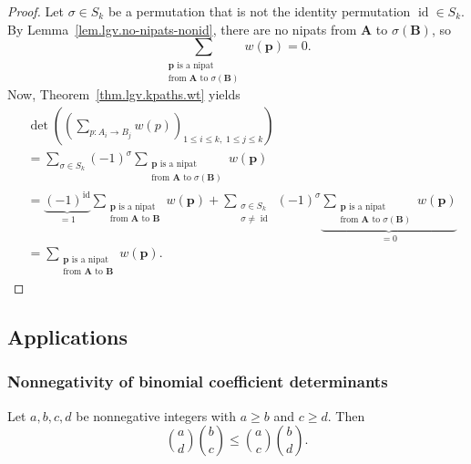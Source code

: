 \begin{proof}
Let $\sigma \in S_k$ be a permutation that is not the identity
permutation $\operatorname{id} \in S_k$.
By Lemma~\ref{lem.lgv.no-nipats-nonid}, there are no nipats from
$\mathbf{A}$ to $\sigma(\mathbf{B})$, so
\[
  \sum_{\substack{\mathbf{p} \text{ is a nipat} \\ \text{from } \mathbf{A} \text{ to } \sigma(\mathbf{B})}}
    w(\mathbf{p}) = 0.
\]
Now, Theorem~\ref{thm.lgv.kpaths.wt} yields
\begin{align*}
  &\det\!\left(\left(\sum_{p : A_i \to B_j} w(p)\right)_{1 \le i \le k,\; 1 \le j \le k}\right) \\
  &= \sum_{\sigma \in S_k} (-1)^{\sigma}
    \sum_{\substack{\mathbf{p} \text{ is a nipat} \\ \text{from } \mathbf{A} \text{ to } \sigma(\mathbf{B})}}
    w(\mathbf{p}) \\
  &= \underbrace{(-1)^{\operatorname{id}}}_{=1}
    \sum_{\substack{\mathbf{p} \text{ is a nipat} \\ \text{from } \mathbf{A} \text{ to } \mathbf{B}}}
    w(\mathbf{p})
    + \sum_{\substack{\sigma \in S_k \\ \sigma \ne \operatorname{id}}} (-1)^{\sigma}
      \underbrace{\sum_{\substack{\mathbf{p} \text{ is a nipat} \\ \text{from } \mathbf{A} \text{ to } \sigma(\mathbf{B})}}
        w(\mathbf{p})}_{= 0} \\
  &= \sum_{\substack{\mathbf{p} \text{ is a nipat} \\ \text{from } \mathbf{A} \text{ to } \mathbf{B}}}
    w(\mathbf{p}).
\end{align*}
\end{proof}

\subsection{Applications}

\subsubsection{Nonnegativity of binomial coefficient determinants}

\begin{lemma}
\label{lem.lgv.binom-fkg}
\leanhelper
\leanok
Let $a, b, c, d$ be nonnegative integers with $a \ge b$ and $c \ge d$.  Then
\[
  \binom{a}{d} \binom{b}{c} \le \binom{a}{c} \binom{b}{d}.
\]
\end{lemma}

